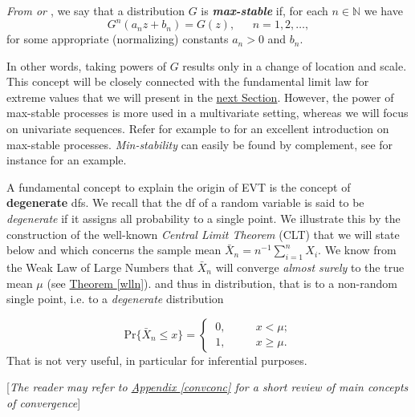 \begin{definition} \label{maxstab}
	\emph{From \cite{leadbetter_extremes_1983} or \cite{resnick_extreme_1987}}, we say that a distribution $G$ is \emph{\textbf{max-stable}} if, for each $n\in\mathbb{N}$ we have	
	\begin{equation}
	G^n(a_nz+b_n)=G(z), \ \ \ \ \ \ \ n= 1,2,\dots ,
	\end{equation}
	for some appropriate (normalizing) constants $a_n>0$ and $b_n$.
\end{definition}
In other words, taking powers of $G$ results only in a change of location and scale. This concept will be closely connected with the fundamental limit law for extreme values that we will present in the \hyperref[sec:extrtypethm]{next Section}.
However, the power of max-stable processes is more used in a multivariate setting, whereas we will focus on univariate sequences. Refer for example to \citet{ribatet_spatial_2015} for an excellent introduction on max-stable processes.
\emph{Min-stability} can easily be found by complement, see for instance \citet[pp.23]{ reiss_statistical_2007} for an example.


A fundamental concept to explain the origin of EVT is the concept of \textbf{degenerate} dfs. We recall that the df of a random variable is said to be \emph{degenerate} if it assigns all probability to a single point.
We illustrate this by the construction of the well-known \emph{Central Limit Theorem} (CLT) that we will state below and which concerns the sample mean $\bar{X}_n=n^{-1}\sum_{i=1}^nX_i$. We know from the Weak Law of Large Numbers that  $\bar{X}_n$ will converge \emph{almost surely} to the true mean $\mu$ (see \hyperref[wlln]{Theorem \ref{wlln}}). and thus in distribution, that is to a non-random single point, i.e. to a \emph{degenerate} distribution 

\begin{equation*}
\text{Pr}\big\{\bar{X}_n\leq x\big\}= \begin{cases}
\ 0, \ \ \ \ \ \ \ \ \ \ \ \ x<\mu; \\
\ 1, \ \ \ \  \ \ \ \ \ \ \ \ x\geq \mu. 
\end{cases}
\end{equation*}
That is not very useful, in particular for inferential purposes. \\
\vspace{-.7cm}
\begin{center}\small{[\textit{The reader may refer to \hyperref[convconc]{Appendix \ref{convconc}} for a short review of main concepts of convergence}]}
\end{center}

